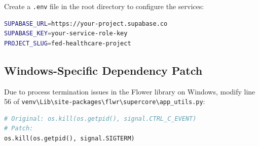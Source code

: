 Create a \texttt{.env} file in the root directory to configure the services:

\begin{lstlisting}[language=bash]
SUPABASE_URL=https://your-project.supabase.co
SUPABASE_KEY=your-service-role-key
PROJECT_SLUG=fed-healthcare-project
\end{lstlisting}

\subsection{Windows-Specific Dependency Patch}

Due to process termination issues in the Flower library on Windows, modify line 56 of \texttt{venv\textbackslash Lib\textbackslash site-packages\textbackslash flwr\textbackslash supercore\textbackslash app\_utils.py}:

\begin{lstlisting}[language=Python]
# Original: os.kill(os.getpid(), signal.CTRL_C_EVENT)
# Patch:
os.kill(os.getpid(), signal.SIGTERM)
\end{lstlisting}

